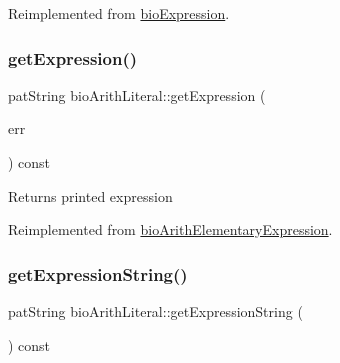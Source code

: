 Reimplemented from \hyperlink{classbio_expression_a5915579d1193f25f216c1e273c97f2ce}{bio\+Expression}.

\mbox{\label{classbio_arith_literal_ae55e7cbd7d3561b56af50fc741009a60}} 
\subsubsection{\texorpdfstring{get\+Expression()}{getExpression()}}
{\footnotesize\ttfamily pat\+String bio\+Arith\+Literal\+::get\+Expression (\begin{DoxyParamCaption}\item[{pat\+Error $\ast$\&}]{err }\end{DoxyParamCaption}) const\hspace{0.3cm}{\ttfamily [virtual]}}

\begin{DoxyReturn}{Returns}
printed expression 
\end{DoxyReturn}


Reimplemented from \hyperlink{classbio_arith_elementary_expression_a9293635c83789f547b5642855f8c8f16}{bio\+Arith\+Elementary\+Expression}.

\mbox{\label{classbio_arith_literal_ab75046eaffcb688b83031da7f91653f9}} 
\subsubsection{\texorpdfstring{get\+Expression\+String()}{getExpressionString()}}
{\footnotesize\ttfamily pat\+String bio\+Arith\+Literal\+::get\+Expression\+String (\begin{DoxyParamCaption}{ }\end{DoxyParamCaption}) const\hspace{0.3cm}{\ttfamily [virtual]}}

